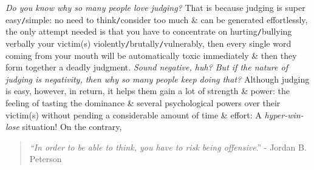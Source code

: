 \documentclass[12pt,twoside]{book}
\begin{document}
{\it Do you know why so many people love judging?} That is because judging is super easy{\tt/}simple: no need to think{\tt/}consider too much \& can be generated effortlessly, the only attempt needed is that you have to concentrate on hurting{\tt/}bullying verbally your victim(s) violently{\tt/}brutally{\tt/}vulnerably, then every single word coming from your mouth will be automatically toxic immediately \& then they form together a deadly judgment. {\it Sound negative, huh? But if the nature of judging is negativity, then why so many people keep doing that?} Although judging is easy, however, in return, it helps them gain a lot of strength \& power: the feeling of tasting the dominance \& several psychological powers over their victim(s) without pending a considerable amount of time \& effort: A {\it hyper-win-lose} situation! On the contrary,
\begin{quotation}
	{\it``In order to be able to think, you have to risk being offensive}.'' - {\sc Jordan B. Peterson}
\end{quotation}
\end{document}
